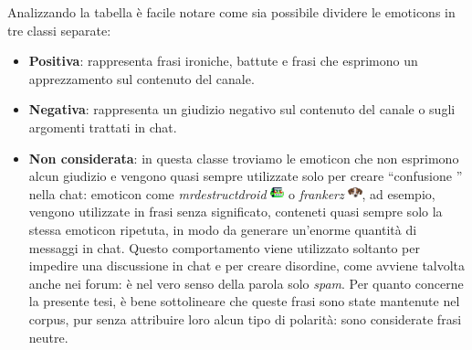 \documentclass[a4paper,12pt,openright,twoside]{report}
\theoremstyle{definition}
\begin{document}
Analizzando la tabella è facile notare come sia possibile dividere le emoticons in tre classi separate:
\begin{itemize}
\item \textbf{Positiva}: rappresenta frasi ironiche, battute e frasi che esprimono un apprezzamento sul contenuto del canale.
\item \textbf{Negativa}: rappresenta un giudizio negativo sul contenuto del canale o sugli argomenti trattati in chat.
\item \textbf{Non considerata}: in questa classe troviamo le emoticon che non esprimono alcun giudizio 
e vengono quasi sempre utilizzate solo per creare ``confusione '' nella chat:
emoticon come \emph{mrdestructdroid} \includegraphics[height=0.4cm, width=0.4cm]{Immagini/Emoticons/mrdestructoid.png} o \emph{frankerz} \includegraphics[height=0.4cm, width=0.4cm]{Immagini/Emoticons/frankerz.png},
ad esempio, vengono utilizzate in frasi senza significato, conteneti quasi
sempre solo la stessa emoticon ripetuta,
in modo da generare un'enorme quantità di messaggi in chat. 
Questo comportamento viene utilizzato soltanto per impedire 
una discussione in chat e per creare disordine, come avviene talvolta anche nei forum: 
è nel vero senso della parola solo \emph{spam}. 
Per quanto concerne la presente tesi, è bene sottolineare che
queste frasi sono state mantenute nel corpus, pur senza attribuire loro alcun tipo di polarità: sono considerate frasi neutre.
\end{itemize}
\end{document}
